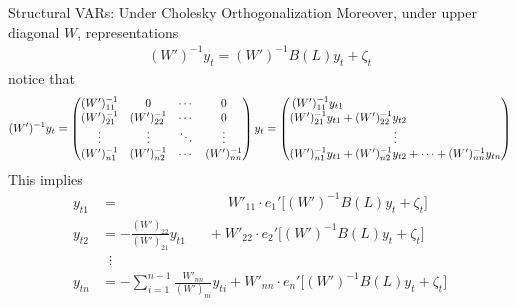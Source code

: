 \documentclass[aspectratio=169, handout]{beamer}
\begin{document}
{\scriptsize
\begin{frame}{Structural VARs: Under Cholesky Orthogonalization}
Moreover, under upper diagonal $W$, representations
\begin{align*}
  (W')^{-1}y_t = (W')^{-1} B(L)y_t +\zeta_t
\end{align*}
notice that
\begin{align*}
  (W')^{-1}y_t
  =
  \begin{pmatrix}
    (W')^{-1}_{11} & 0 & \cdots & 0 \\
    (W')^{-1}_{21} & (W')^{-1}_{22} & \cdots & 0 \\
    \vdots & \vdots & \ddots & \vdots \\
    (W')^{-1}_{n1} & (W')^{-1}_{n2} & \cdots & (W')^{-1}_{nn} \\
  \end{pmatrix}
  y_t
  =
  \begin{pmatrix}
    (W')^{-1}_{11}y_{t1}
    \;\;\;
    \hphantom{%
      (W')^{-1}_{n2}y_{t2} + \cdots +
      (W')^{-1}_{nn}y_{tn}
    }
    \\
    (W')^{-1}_{21}y_{t1} + (W')^{-1}_{22}y_{t2}
    \;
    \hphantom{%
      + \cdots +
      (W')^{-1}_{nn}y_{tn}
    }
    \\ \vdots \\
    (W')^{-1}_{n1}y_{t1} + (W')^{-1}_{n2}y_{t2} + \cdots +
    (W')^{-1}_{nn}y_{tn}
  \end{pmatrix}
\end{align*}
\pause
This implies
\begin{align*}
  y_{t1}
  &=
  \qquad\quad
  \qquad\quad
  \quad
  \,\;\;
  W'_{11}
  \cdot
  e_1'\big[(W')^{-1}B(L)y_t + \zeta_t\big]
  \\
  y_{t2}
  &=
  -
  \frac{(W')_{22}}{(W')_{21}}
  y_{t1}
  \quad
  \;\;
  +
  W'_{22}
  \cdot
  e_2'\big[(W')^{-1}B(L)y_t + \zeta_t\big]
  \\
  & \;\;\vdots
  \\
  y_{tn}
  &=
  -
  \sum_{i=1}^{n-1}
  \frac{W'_{nn}}{(W')_{ni}}
  y_{ti}
  +
  W'_{nn}\cdot e_n'\big[(W')^{-1}B(L)y_t + \zeta_t\big]
\end{align*}
\end{frame}
}
\end{document}
